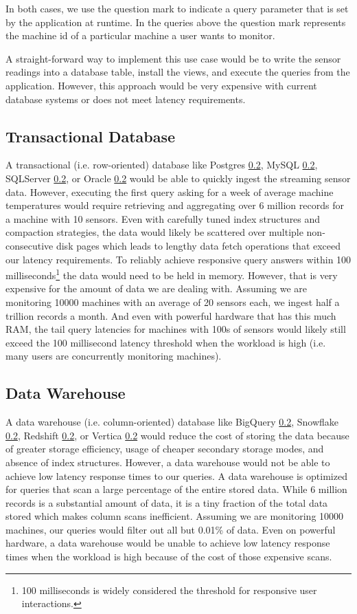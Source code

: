 \documentclass[	DIV=calc,%
							paper=letter,%
							fontsize=11pt,%
							twocolumn]{scrartcl}	 					%
\begin{document}
In both cases, we use the question mark to indicate a query parameter that is set by the application at runtime. In the queries above the question mark represents the machine id of a particular machine a user wants to monitor.

A straight-forward way to implement this use case would be to write the sensor readings into a database table, install the views, and execute the queries from the application. However, this approach would be very expensive with current database systems or does not meet latency requirements.

\subsection{Transactional Database}

A transactional (i.e. row-oriented) database like Postgres \ref{}, MySQL \ref{}, SQLServer \ref{}, or Oracle \ref{} would be able to quickly ingest the streaming sensor data. However, executing the first query asking for a week of average machine temperatures would require retrieving and aggregating over 6 million records for a machine with 10 sensors. Even with carefully tuned index structures and compaction strategies, the data would likely be scattered over multiple non-consecutive disk pages which leads to lengthy data fetch operations that exceed our latency requirements. To reliably achieve responsive query answers within 100 milliseconds\footnote{100 milliseconds is widely considered the threshold for responsive user interactions.} the data would need to be held in memory. However, that is very expensive for the amount of data we are dealing with. Assuming we are monitoring 10000 machines with an average of 20 sensors each, we ingest half a trillion records a month. And even with powerful hardware that has this much RAM, the tail query latencies for machines with 100s of sensors would likely still exceed the 100 millisecond latency threshold when the workload is high (i.e. many users are concurrently monitoring machines).

\subsection{Data Warehouse}

A data warehouse (i.e. column-oriented) database like BigQuery \ref{}, Snowflake \ref{}, Redshift \ref{}, or Vertica \ref{} would reduce the cost of storing the data because of greater storage efficiency, usage of cheaper secondary storage modes, and absence of index structures. However, a data warehouse would not be able to achieve low latency response times to our queries. A data warehouse is optimized for queries that scan a large percentage of the entire stored data. While 6 million records is a substantial amount of data, it is a tiny fraction of the total data stored which makes column scans inefficient. Assuming we are monitoring 10000 machines, our queries would filter out all but 0.01\% of data. Even on powerful hardware, a data warehouse would be unable to achieve low latency response times when the workload is high because of the cost of those expensive scans.
\end{document}

